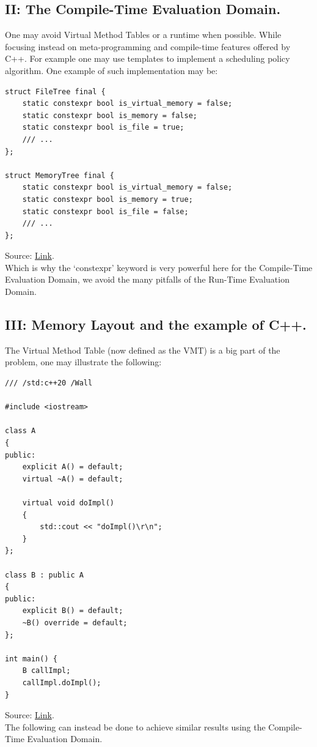 \documentclass[11pt, a4paper]{article}
\begin{document}
\subsection{II: The Compile-Time Evaluation Domain.}
{
One may avoid Virtual Method Tables or a runtime when possible. While focusing instead on meta-programming and compile-time features offered by C++. 
For example one may use templates to implement a scheduling policy algorithm.
One example of such implementation may be:

\begin{lstlisting}
struct FileTree final {
    static constexpr bool is_virtual_memory = false;
    static constexpr bool is_memory = false;
    static constexpr bool is_file = true;
    /// ...
};

struct MemoryTree final {
    static constexpr bool is_virtual_memory = false;
    static constexpr bool is_memory = true;
    static constexpr bool is_file = false;
    /// ...
};
\end{lstlisting} Source: \href{https://github.com/nekernel-org/nekernel/blob/develop/src/kernel/KernelKit/CoreProcessScheduler.h#L78-L105}{Link}. \\ Which is why the `constexpr' keyword is very powerful here for the Compile-Time Evaluation Domain, we avoid the many pitfalls of the Run-Time Evaluation Domain.

\subsection{III: Memory Layout and the example of C++.}
{
The Virtual Method Table (now defined as the VMT) is a big part of the problem, one may illustrate the following:

\begin{lstlisting}
/// /std:c++20 /Wall

#include <iostream>

class A
{
public:
    explicit A() = default;
    virtual ~A() = default;

    virtual void doImpl() 
    {
        std::cout << "doImpl()\r\n";
    }
};

class B : public A
{
public:
    explicit B() = default;
    ~B() override = default;
};

int main() {
    B callImpl;
    callImpl.doImpl();
}
\end{lstlisting} Source: \href{https://godbolt.org/z/aK6Y98xnd}{Link}. \\The following can instead be done to achieve similar results using the Compile-Time Evaluation Domain.

}}
\end{document}
